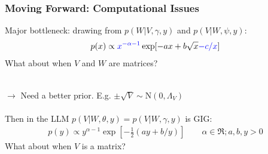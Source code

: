 \documentclass[xcolor=dvipsnames]{beamer}
\newcommand\N{\mathrm{N}}
\begin{document}
\begin{frame}
\frametitle{Moving Forward: Computational Issues}
Major bottleneck: drawing from $p(W|V,\gamma,y)$ and $p(V|W,\psi,y)$:
\begin{align*}
p(x)\propto {\color{blue}x^{-\alpha-1}}\exp[-ax + b\sqrt{x} {\color{blue}- c/x}] 
\end{align*}
What about when $V$ and $W$ are matrices?\\~

$\to$ Need a better prior. E.g. $\pm \sqrt{V} \sim \N(0,\Lambda_V)$\\~\\

Then in the LLM $p(V|W,\theta,y)=p(V|W,\gamma,y)$ is GIG:
\begin{align*}
p(y) \propto y^{\alpha-1}\exp\left[-\frac{1}{2}(ay + b/y)\right] \qquad \alpha\in\Re; a,b,y>0
\end{align*}
What about when $V$ is a matrix?
\end{frame}
\end{document}
